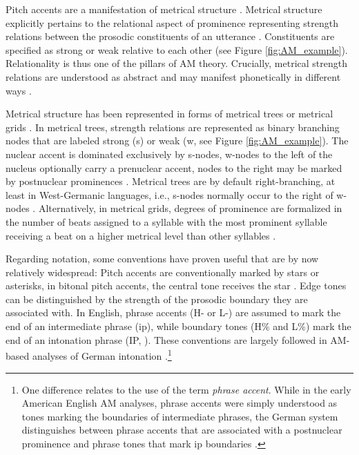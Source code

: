 Pitch accents are a manifestation of metrical structure \citep[269]{laddIntonationalPhonology2008}. Metrical structure explicitly pertains to the relational aspect of prominence representing strength relations between the prosodic constituents of an utterance \citep[37]{arvanitiAutosegmentalMetricalModelIntonational2022}. Constituents are specified as strong or weak relative to each other (see Figure \ref{fig:AM_example}). Relationality is thus one of the pillars of AM theory. Crucially, metrical strength relations are understood as abstract and may manifest phonetically in different ways \citep[55-56]{laddIntonationalPhonology2008}. 

Metrical structure has been represented in forms of metrical trees \citep[e.g.,][]{libermanIntonationalSystemEnglish1975} or metrical grids \citep[e.g.,][]{selkirkPhonologySyntaxRelation1984}. In metrical trees, strength relations are represented as binary branching nodes that are labeled strong (s) or weak (w, see Figure \ref{fig:AM_example}). The nuclear accent is dominated exclusively by s-nodes, w-nodes to the left of the nucleus optionally carry a prenuclear accent, nodes to the right may be marked by postnuclear prominences \citep[3]{calhounCentralityMetricalStructure2010}. Metrical trees are by default right-branching, at least in West-Germanic languages, i.e., s-nodes normally occur to the right of w-nodes \citep{libermanIntonationalSystemEnglish1975, laddIntonationalPhonology2008}. Alternatively, in metrical grids, degrees of prominence are formalized in the number of beats assigned to a syllable with the most prominent syllable receiving a beat on a higher metrical level than other syllables \citep[15-16]{selkirkPhonologySyntaxRelation1984}. 

\largerpage
Regarding notation, some conventions have proven useful that are by now relatively widespread: Pitch accents are conventionally marked by stars or asterisks, in bitonal pitch accents, the central tone receives the star \citep[87]{laddIntonationalPhonology2008}. Edge tones can be distinguished by the strength of the prosodic boundary they are associated with. In English, phrase accents (H- or L-) are assumed to mark the end of an intermediate phrase (ip), while boundary tones (H\% and L\%) mark the end of an intonation phrase (IP, \citealt{pierrehumbertPhonologyPhoneticsEnglish1980, beckmanIntonationalStructureJapanese1986}). These conventions are largely followed in AM-based analyses of German intonation \citep[e.g.,][]{feryGermanIntonationalPatterns1993, griceGermanIntonationAutosegmentalMetrical2005}.\footnote{One difference relates to the use of the term \textit{phrase accent}. While in the early American English AM analyses, phrase accents were simply understood as tones marking the boundaries of intermediate phrases, the German system distinguishes between phrase accents that are associated with a postnuclear prominence and phrase tones that mark ip boundaries \citep{griceIntonationLautspracheTonale2016}.} 

